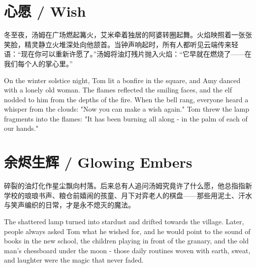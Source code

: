 \section*{心愿 / Wish}
冬至夜，汤姆在广场燃起篝火，艾米牵着独居的阿婆转圈起舞。火焰映照着一张张笑脸，精灵静立火堆深处向他颔首。当钟声响起时，所有人都听见云端传来轻语：“现在你可以重新许愿了。”汤姆将油灯残片抛入火焰：“它早就在燃烧了——在我们每个人的掌心里。”

\begin{flushright}
    On the winter solstice night, Tom lit a bonfire in the square, and Amy danced with a lonely old woman. The flames reflected the smiling faces, and the elf nodded to him from the depths of the fire. When the bell rang, everyone heard a whisper from the clouds: "Now you can make a wish again." Tom threw the lamp fragments into the flames: "It has been burning all along - in the palm of each of our hands."
\end{flushright}

\section*{余烬生辉 / Glowing Embers}
碎裂的油灯化作星尘飘向村落。后来总有人追问汤姆究竟许了什么愿，他总指指新学校的琅琅书声、粮仓前嬉闹的孩童、月下对弈老人的棋盘——那些用泥土、汗水与笑声编织的日常，才是永不熄灭的魔法。

\begin{flushright}
    The shattered lamp turned into stardust and drifted towards the village. Later, people always asked Tom what he wished for, and he would point to the sound of books in the new school, the children playing in front of the granary, and the old man's chessboard under the moon - those daily routines woven with earth, sweat, and laughter were the magic that never faded.
\end{flushright}